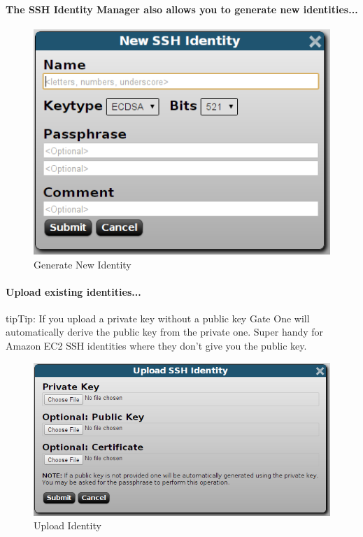 \documentclass[letterpaper,10pt,openany]{sphinxmanual}
\begin{document}
\paragraph{The SSH Identity Manager also allows you to generate new identities...}
\begin{figure}[htbp]
\centering
\capstart

\includegraphics{gateone_new_ssh_identity.png}
\caption{Generate New Identity}\end{figure}
\paragraph{Upload existing identities...}

\begin{notice}{tip}{Tip:}
If you upload a private key without a public key Gate One will automatically derive the public key from the private one.  Super handy for Amazon EC2 SSH identities where they don't give you the public key.
\end{notice}
\begin{figure}[htbp]
\centering
\capstart

\includegraphics{gateone_upload_ssh_identity.png}
\caption{Upload Identity}\end{figure}
\end{document}
